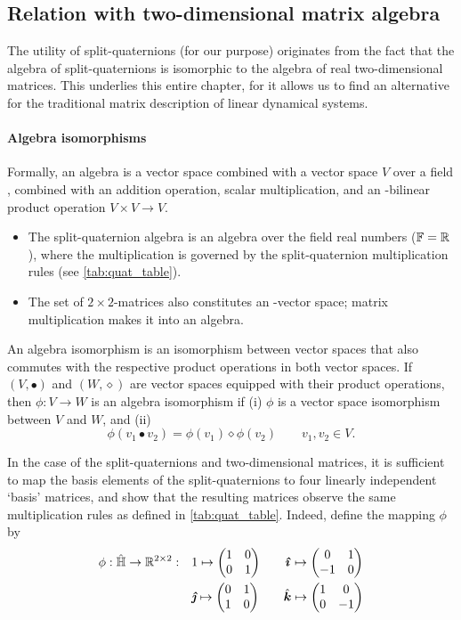 \subsection{Relation with two-dimensional matrix algebra}
\label{ssec:quat_isomorphism}
The utility of split-quaternions (for our purpose) originates from the fact that the algebra of split-quaternions is isomorphic to the algebra of real two-dimensional matrices. This underlies this entire chapter, for it allows us to find an alternative for the traditional matrix description of linear dynamical systems. 

\paragraph{Algebra isomorphisms} Formally, an algebra is a vector space combined with a vector space $V$ over a field \field, combined with an addition operation, scalar multiplication, and an \field-bilinear product operation $V\times V \to V$. \cite{Schuller2014}
\begin{itemize}
    \item The split-quaternion algebra is an algebra over the field real numbers ($\mathbb{F} = \mathbb{R}$), where the multiplication is governed by the split-quaternion multiplication rules (see \cref{tab:quat_table}).
    \item The set of $2\times2$-matrices also constitutes an \real-vector space; matrix multiplication makes it into an algebra.
\end{itemize}

An algebra isomorphism is an isomorphism between vector spaces that also commutes with the respective product operations in both vector spaces. If $(V, \bullet)$ and $(W, \diamond)$ are vector spaces equipped with their product operations, then $\phi: V \to W$ is an algebra isomorphism if (i) $\phi$ is a vector space isomorphism between $V$ and $W$, and (ii) \cite{Lang2002}
$$ \phi(v_1 \bullet v_2) = \phi(v_1)\diamond\phi(v_2) \qquad v_1, v_2 \in V. $$

In the case of the split-quaternions and two-dimensional matrices, it is sufficient to map the basis elements of the split-quaternions to four linearly independent `basis' matrices, and show that the resulting matrices observe the same multiplication rules as defined in \cref{tab:quat_table}. Indeed, define the mapping $\phi$ by 
\begin{equation}
    \begin{split}
        \phi: \spquaternions \to \real^{2\times2}: \quad &  
         1 \mapsto  \mqty(1 & 0 \\ 0 & 1) \qquad
        \quati \mapsto  \mqty(0 & 1 \\  -1 & 0) \\
        & \quatj \mapsto  \mqty(0 & 1 \\  1 & 0)\qquad 
        \quatk \mapsto  \mqty(1 & 0 \\  0 & -1) \\
    \end{split}
    \label{eq:basis_elements}
\end{equation}

